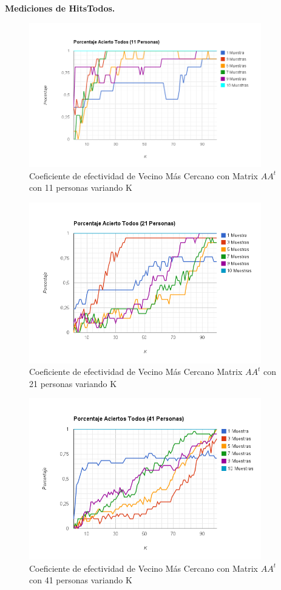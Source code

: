 \textbf{Mediciones de HitsTodos. }

\begin{figure}[H]
\includegraphics[width=0.9\textwidth]{img/imagef10.png}
     \caption{Coeficiente de efectividad de Vecino Más Cercano con Matrix $AA^t$ con 11 personas variando K}
\end{figure}

\begin{figure}[H]
\includegraphics[width=0.9\textwidth]{img/imagef11.png}
     \caption{Coeficiente de efectividad de Vecino Más Cercano Matrix $AA^t$ con 21 personas variando K}
\end{figure}

\begin{figure}[H]
\includegraphics[width=0.9\textwidth]{img/imagef12.png}
     \caption{Coeficiente de efectividad de Vecino Más Cercano con Matrix $AA^t$ con 41 personas variando K}
\end{figure}

